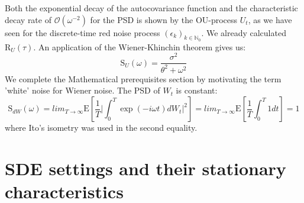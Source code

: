 \documentclass[%
thesis=student,%
coverpage=false,%
titlepage=false,%
headmarks=true, %
english,%
font=libertine, %
math=newpxtx, %
BCOR=5mm,%
coverBCOR=11mm%
]{tumbook}
\begin{document}
Both the exponential decay of the autocovariance function and the characteristic decay rate of $\mathcal{O}(\omega^{-2})$ for the PSD is shown by the OU-process $U_{t}$, as we have seen for the discrete-time red noise process $(\epsilon_{k})_{k\in\mathbb{N}_{0}}$. We already calculated $\mathrm{R}_{U}(\tau)$. 
An application of the Wiener-Khinchin theorem gives us: 
\[
    \mathrm{S}_{U}(\omega) = \frac{\sigma^2}{\theta^{2} + \omega^{2}}
\]
We complete the Mathematical prerequisites section by motivating the term 'white' noise for Wiener noise. The PSD of $W_{t}$ is constant:
\[
\mathrm{S}_{dW}(\omega) =  lim_{T\rightarrow\infty}\mathrm{E}[\frac{1}{T}\lvert\int_{0}^{T}\exp(-i\omega t)dW_{t}\rvert^{2}] = lim_{T\rightarrow \infty}\mathrm{E}[\frac{1}{T}\int_{0}^{T}1dt] = 1
\]
where Ito's isometry was used in the second equality.



\chapter{SDE settings and their stationary characteristics}
\end{document}
